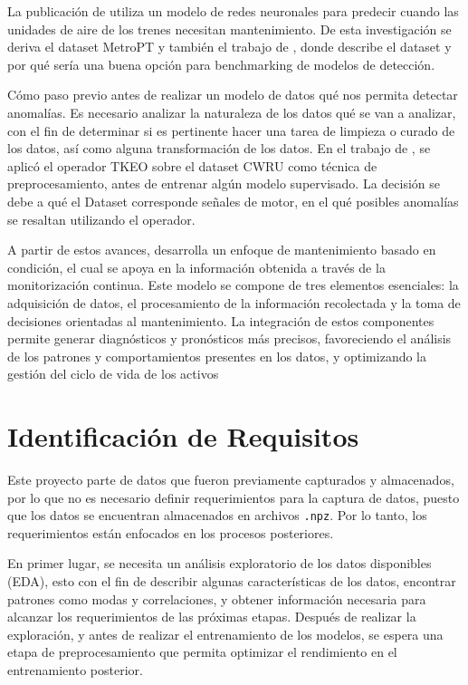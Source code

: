 \documentclass[11pt,a4paper,spanish]{book}
\numberwithin{equation}{chapter}
\numberwithin{figure}{chapter}
\begin{document}
La publicación de \cite{davari2021} utiliza un modelo de redes neuronales para predecir 
cuando las unidades de aire de los trenes necesitan mantenimiento. De esta investigación 
se deriva el dataset MetroPT y también el trabajo de  \cite{veloso2022metrpt}, donde 
describe el dataset y por qué sería una buena opción para benchmarking de modelos de 
detección.


Cómo paso previo antes de realizar un modelo de datos qué nos permita detectar anomalías.
Es necesario analizar la naturaleza de los datos qué se van a analizar, con el fin de 
determinar si es pertinente hacer una tarea de limpieza o curado de los datos, así como 
alguna transformación de los datos. En el trabajo de \cite{yu2025tkeo}, se aplicó el 
operador TKEO sobre el dataset CWRU como técnica de preprocesamiento, antes de entrenar 
algún modelo supervisado. La decisión se debe a qué el Dataset corresponde  señales de 
motor, en el qué posibles anomalías se resaltan utilizando el operador.


A partir de estos avances, \cite{jardine2006review} desarrolla un enfoque de 
mantenimiento basado en condición, el cual se apoya en la información obtenida a 
través de la monitorización continua. Este modelo se compone de tres elementos 
esenciales: la adquisición de datos, el procesamiento de la información recolectada y 
la toma de decisiones orientadas al mantenimiento. La integración de estos componentes 
permite generar diagnósticos y pronósticos más precisos, favoreciendo el análisis de 
los patrones y comportamientos presentes en los datos, y optimizando la gestión del 
ciclo de vida de los activos \cite{jardine2006review}


\chapter{Identificación de Requisitos}


Este proyecto parte de datos que fueron previamente capturados y almacenados, por lo 
que no es necesario definir requerimientos para la captura de datos, puesto que los 
datos se encuentran almacenados en archivos \texttt{.npz}. 
Por lo tanto, los requerimientos están enfocados en los procesos posteriores. 


En primer lugar,  se necesita un análisis exploratorio de los datos disponibles (EDA), 
esto con el fin de describir algunas características de los datos, encontrar patrones 
como modas y correlaciones, y obtener información necesaria para alcanzar los 
requerimientos de las próximas etapas.  Después de realizar la exploración, y antes de 
realizar el entrenamiento de los modelos, se espera una etapa de preprocesamiento que 
permita optimizar el rendimiento en el entrenamiento posterior.
\end{document}

